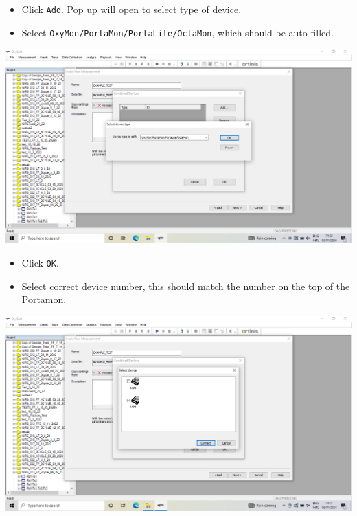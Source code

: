 \documentclass[
]{book}
\providecommand{\tightlist}{%
  \setlength{\itemsep}{0pt}\setlength{\parskip}{0pt}}
\begin{document}
\begin{itemize}
\tightlist
\item
  Click \texttt{Add}. Pop up will open to select type of device.
\item
  Select \texttt{OxyMon/PortaMon/PortaLite/OctaMon}, which should be auto filled.
\end{itemize}

\includegraphics[width=1\linewidth]{images/startnewmeasurement/07_type_of_device_to_add}

\begin{itemize}
\tightlist
\item
  Click \texttt{OK}.
\item
  Select correct device number, this should match the number on the top of the Portamon.
\end{itemize}

\includegraphics[width=1\linewidth]{images/startnewmeasurement/08_device_number}
\end{document}
